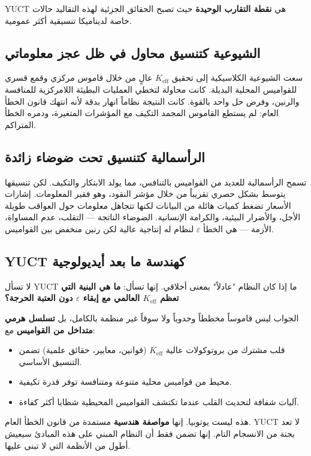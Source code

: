 \documentclass[12pt,a4paper]{article}
\newcommand{\Keff}{K_{\mathrm{eff}}}
\begin{document}
	YUCT هي \textbf{نقطة التقارب الوحيدة} حيث تصبح الحقائق الجزئية لهذه التقاليد حالات خاصة لديناميكا تنسيقية أكثر عمومية.
	
	\subsection{الشيوعية كتنسيق محاول في ظل عجز معلوماتي}
	
	سعت الشيوعية الكلاسيكية إلى تحقيق \(\Keff\) عالٍ من خلال قاموس مركزي وقمع قسري للقواميس المحلية البديلة. كانت محاولة لتخطي العمليات البطيئة اللامركزية للمنافسة والرنين، وفرض حل واحد بالقوة. كانت النتيجة نظاماً انهار بدقة لأنه انتهك قانون الخطأ العام: لم يستطع القاموس المجمد التكيف مع المؤشرات المتغيرة، ودمره الخطأ المتراكم.
	
	\subsection{الرأسمالية كتنسيق تحت ضوضاء زائدة}
	
	تسمح الرأسمالية للعديد من القواميس بالتنافس، مما يولد الابتكار والتكيف. لكن تنسيقها يتوسط بشكل حصري تقريباً من خلال مؤشر النقود، وهو فقير المعلومات. إشارات الأسعار تضغط كميات هائلة من البيانات لكنها تتجاهل معلومات حول العواقب طويلة الأجل، والأضرار البيئية، والكرامة الإنسانية. الضوضاء الناتجة — التقلب، عدم المساواة، الأزمة — هي الخطأ \(\varepsilon\) لنظام له إنتاجية عالية لكن رنين منخفض بين القواميس.
	
	\subsection{YUCT كهندسة ما بعد أيديولوجية}
	
	لا تسأل YUCT ما إذا كان النظام "عادلاً" بمعنى أخلاقي. إنها تسأل: \textbf{ما هي البنية التي تعظم \(K_{\mathrm{eff}}\) العالمي مع إبقاء \(\varepsilon\) دون العتبة الحرجة؟}
	
	الجواب ليس قاموساً مخططاً وحدوياً ولا سوقاً غير منظمة بالكامل، بل \textbf{تسلسل هرمي متداخل من القواميس} مع:
	\begin{itemize}[leftmargin=*]
		\item قلب مشترك من بروتوكولات عالية \(\Keff\) (قوانين، معايير، حقائق علمية) تضمن التنسيق الأساسي.
		\item محيط من قواميس محلية متنوعة ومتنافسة توفر قدرة تكيفية.
		\item آليات شفافة لتحديث القلب عندما تكتشف القواميس المحيطية شظايا أكثر كفاءة.
	\end{itemize}
	
	هذه ليست يوتوبيا. إنها \textbf{مواصفة هندسية} مستمدة من قانون الخطأ العام. YUCT لا تعد بجنة من الانسجام التام. إنها تضمن فقط أن النظام المبني على هذه المبادئ سيعيش أطول من الأنظمة التي لا تبنى عليها.
	
\end{document}
